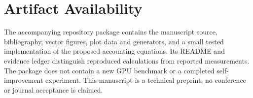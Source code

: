 \documentclass[journal]{IEEEtran}
\begin{document}
\section*{Artifact Availability}
The accompanying repository package contains the manuscript source, bibliography, vector figures, plot data and generators, and a small tested implementation of the proposed accounting equations. Its README and evidence ledger distinguish reproduced calculations from reported measurements. The package does not contain a new GPU benchmark or a completed self-improvement experiment. This manuscript is a technical preprint; no conference or journal acceptance is claimed.

\printbibliography
\end{document}
